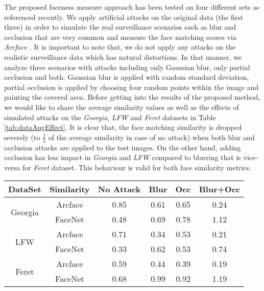 \documentclass[runningheads]{llncs}
\newcommand*\textfrac[2]{
  \frac{\text{#1}}{\text{#2}}
}
\begin{document}
The proposed faceness measure approach has been tested on four different sets as referenced recently. We apply artificial attacks on the original data (the first three) in order to simulate the real surveillance scenarios such as blur and occlusion that are very common and measure the face matching scores via \textit{Arcface} \cite{ArcFace2018}. It is important to note that, we do not apply any attacks on the realistic surveillance data which has natural distortions. In that manner, we analyze three scenarios with attacks including only Gaussian blur, only partial occlusion and both. Gaussian blur is applied with random standard deviation, partial occlusion is applied by choosing four random points within the image and painting the covered area. Before getting into the results of the proposed method, we would like to share the average similarity values as well as the effects of simulated attacks on the \textit{Georgia}, \textit{LFW} and \textit{Feret} datasets in Table \ref{tab:dataAugEffect}. It is clear that, the face matching similarity is dropped severely (to $\textfrac{1}{3}$ of the average similarity in case of no attack) when both blur and occlusion attacks are applied to the test images. On the other hand, adding occlusion has less impact in \textit{Georgia} and \textit{LFW} compared to blurring that is vice-versa for \textit{Feret} dataset. This behaviour is valid for both face similarity metrics.

\begin{table*}[t]
\centering
\begin{center}
    \caption{The effect of attacks on different average face matching scores for different datasets}
        \begin{tabular}{c c c c c c}
            {DataSet} & Similarity & {No Attack} & {Blur} & {Occ} & Blur+Occ \\
            \hline
            \multirow{2}{*}{Georgia} & Arcface & 0.85 & 0.61 & 0.65 & 0.24 \\
            & FaceNet & 0.48 & 0.69 & 0.78 & 1.12 \\
            \hline
            \multirow{2}{*}{LFW} & Arcface & 0.71 & 0.34 & 0.53 & 0.21 \\
            & FaceNet & 0.33 & 0.62 & 0.53 & 0.74  \\
            \hline
            \multirow{2}{*}{Feret} & Arcface & 0.59 & 0.44 & 0.39 & 0.19 \\
            & FaceNet & 0.68 & 0.99 & 0.92 & 1.19 \\
            \hline
        \end{tabular}
        \label{tab:dataAugEffect}
\end{center}
\centering
\end{table*}
\end{document}
